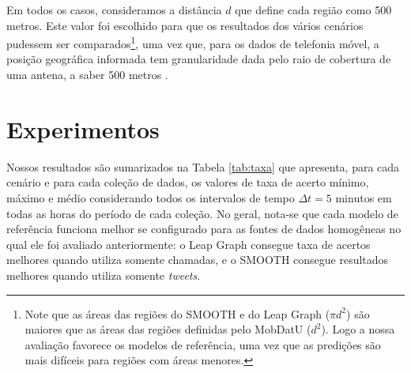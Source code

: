 \documentclass[10pt, a4paper, onecolumn, conference, compsocconf]{IEEEtran}
\begin{document}

Em todos os casos, consideramos a distância $d$ que define cada região como 500 metros. Este valor foi escolhido para que os resultados dos vários cenários pudessem ser comparados\footnote{Note que   as áreas das regiões do SMOOTH e do Leap Graph ($\pi d^2$) são maiores que as áreas das regiões definidas pelo MobDatU ($d^2$). Logo a nossa avaliação favorece os modelos de referência, uma vez que as predições são mais difíceis para regiões com áreas menores.}, uma vez que, para os dados de telefonia móvel, a posição geográfica informada tem granularidade dada pelo raio de cobertura de uma antena, a saber 500 metros . 
 


\section{Experimentos}\label{sec:experimentos}


Nossos resultados são sumarizados na Tabela \ref{tab:taxa} que apresenta, para cada cenário e para cada coleção de dados, os valores de taxa de acerto mínimo, máximo e médio considerando todos os intervalos de tempo $\Delta t = 5$ minutos em todas as horas do período de cada coleção. No geral, nota-se que cada modelo de referência funciona melhor se configurado para as fontes de dados homogêneas no qual ele foi avaliado anteriormente: o Leap Graph consegue taxa de acertos melhores quando utiliza somente chamadas, e o SMOOTH consegue resultados melhores quando utiliza somente \textit{tweets}. 
\end{document}
